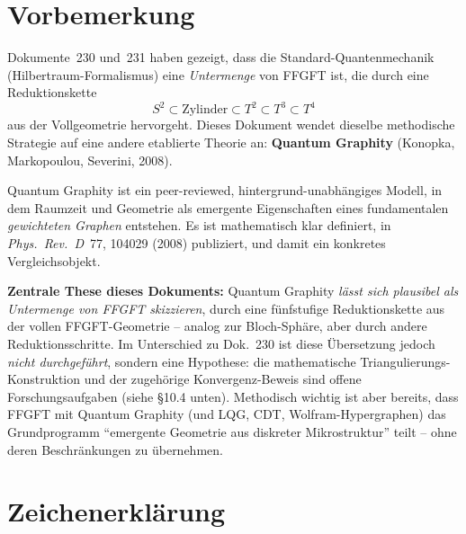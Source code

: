 
\section*{Vorbemerkung}

Dokumente~230 und~231 haben gezeigt, dass die Standard-Quantenmechanik
(Hilbertraum-Formalismus) eine \emph{Untermenge} von FFGFT ist, die
durch eine Reduktionskette
\[
S^2 \subset \text{Zylinder} \subset T^2 \subset T^3 \subset T^4
\]
aus der Vollgeometrie hervorgeht. Dieses Dokument wendet dieselbe
methodische Strategie auf eine andere etablierte Theorie an:
\textbf{Quantum Graphity} (Konopka, Markopoulou, Severini,
2008).

Quantum Graphity ist ein peer-reviewed, hintergrund-unabhängiges
Modell, in dem Raumzeit und Geometrie als emergente Eigenschaften
eines fundamentalen \emph{gewichteten Graphen} entstehen. Es ist
mathematisch klar definiert, in \emph{Phys.~Rev.~D}~77, 104029 (2008)
publiziert, und damit ein konkretes Vergleichsobjekt.

\textbf{Zentrale These dieses Dokuments:} Quantum Graphity \emph{lässt
sich plausibel als Untermenge von FFGFT skizzieren}, durch eine
fünfstufige Reduktionskette aus der vollen FFGFT-Geometrie -- analog
zur Bloch-Sphäre, aber durch andere Reduktionsschritte. Im Unterschied
zu Dok.~230 ist diese Übersetzung jedoch \emph{nicht durchgeführt},
sondern eine Hypothese: die mathematische Triangulierungs-Konstruktion
und der zugehörige Konvergenz-Beweis sind offene Forschungsaufgaben
(siehe §10.4 unten). Methodisch wichtig ist aber bereits, dass FFGFT
mit Quantum Graphity (und LQG, CDT, Wolfram-Hypergraphen) das
Grundprogramm \enquote{emergente Geometrie aus diskreter Mikrostruktur}
teilt -- ohne deren Beschränkungen zu übernehmen.

\section*{Zeichenerklärung}

